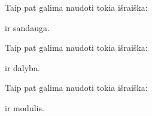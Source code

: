 \documentclass[letterpaper,10pt,lithuanian]{sphinxmanual}
\begin{document}
\begin{fulllineitems}
\label{\detokenize{formules:mul}}
\pysigstartsignatures
\pysiglinewithargsret
{}
{\sphinxparamcomma {}}
{}
\pysigstopsignatures
\sphinxAtStartPar
Taip pat galima naudoti tokia išraiška:

\begin{sphinxVerbatim}[commandchars=\\\{\}]
  
\end{sphinxVerbatim}

\sphinxAtStartPar
{} ir  sandauga.

\end{fulllineitems}


\begin{fulllineitems}
\label{\detokenize{formules:div}}
\pysigstartsignatures
\pysiglinewithargsret
{}
{\sphinxparamcomma {}}
{}
\pysigstopsignatures
\sphinxAtStartPar
Taip pat galima naudoti tokia išraiška:

\begin{sphinxVerbatim}[commandchars=\\\{\}]
  
\end{sphinxVerbatim}

\sphinxAtStartPar
{} ir  dalyba.

\end{fulllineitems}


\begin{fulllineitems}
\label{\detokenize{formules:mod}}
\pysigstartsignatures
\pysiglinewithargsret
{}
{\sphinxparamcomma {}}
{}
\pysigstopsignatures
\sphinxAtStartPar
Taip pat galima naudoti tokia išraiška:

\begin{sphinxVerbatim}[commandchars=\\\{\}]
  
\end{sphinxVerbatim}

\sphinxAtStartPar
{} ir  modulis.

\end{fulllineitems}
\end{document}
